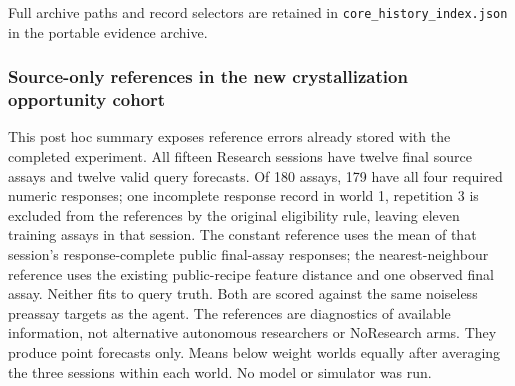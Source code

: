 \documentclass[10pt,a4paper]{article}
\begin{document}
Full archive paths and record selectors are retained in \texttt{core\_history\_index.json} in the portable evidence archive.

\subsubsection{Source-only references in the new crystallization opportunity cohort}\label{source-only-references-in-the-new-crystallization-opportunity-cohort}

This post hoc summary exposes reference errors already stored with the completed experiment. All fifteen Research sessions have twelve final source assays and twelve valid query forecasts. Of 180 assays, 179 have all four required numeric responses; one incomplete response record in world 1, repetition 3 is excluded from the references by the original eligibility rule, leaving eleven training assays in that session. The constant reference uses the mean of that session's response-complete public final-assay responses; the nearest-neighbour reference uses the existing public-recipe feature distance and one observed final assay. Neither fits to query truth. Both are scored against the same noiseless preassay targets as the agent. The references are diagnostics of available information, not alternative autonomous researchers or NoResearch arms. They produce point forecasts only. Means below weight worlds equally after averaging the three sessions within each world. No model or simulator was run.

\end{document}
